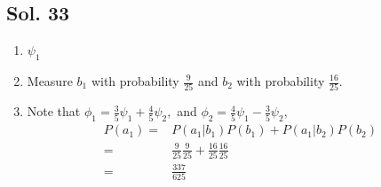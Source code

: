 \subsection*{Sol. 33}
\begin{enumerate}
    \item $\psi_1$
    \item Measure $b_1$ with probability $\frac{9}{25}$ and $b_2$ with probability $\frac{16}{25}.$
    \item 
    Note that $\phi_1=\frac{3}{5}\psi_1+\frac{4}{5}\psi_2,$ and $\phi_2=\frac{4}{5}\psi_1-\frac{3}{5}\psi_2,$
    \begin{align*}
   P(a_1)=&P(a_1|b_1)P(b_1) + P(a_1|b_2)P(b_2)\\
   =& \frac{9}{25}\frac{9}{25} +
   \frac{16}{25}\frac{16}{25}\\
   =&\frac{337}{625}
    \end{align*}

\end{enumerate}


